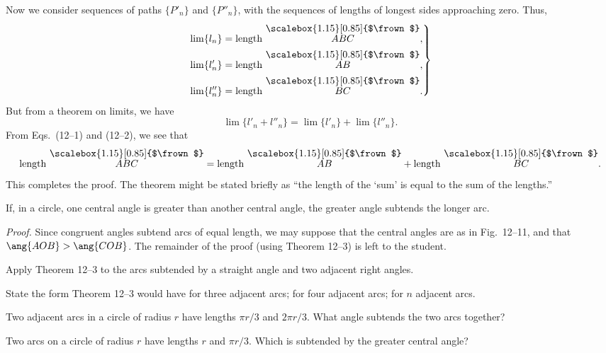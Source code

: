 \documentclass[11pt]{book}
\theoremstyle{bkplain}
\theoremstyle{XIplainnote}
\theoremstyle{bkplain}
\newcommand{\XIIarc}[1]{\overset{\raisebox{-0.25ex}{\scalebox{1.15}[0.85]{$\frown$}}}{#1}}
\theoremstyle{bkplain}
\begin{document}
Now we consider sequences of paths $\{P'_n\}$ and $\{P''_n\}$, with the
sequences of lengths of longest sides approaching zero. Thus,
\begin{equation}
\left.
\begin{aligned}
\lim \{l_n\} &= \text{length } \XIIarc{ABC},\\
\lim \{l'_n\} &= \text{length } \XIIarc{AB},\\
\lim \{l''_n\} &= \text{length } \XIIarc{BC}.
\end{aligned}
\right\}
\end{equation}
But from a theorem on limits, we have
\begin{equation}
\lim \{l'_n + l''_n\} = \lim \{l'_n\} + \lim \{l''_n\}.
\end{equation}
From Eqs.~(12--1) and (12--2), we see that
\begin{equation}
\text{length } \XIIarc{ABC} = \text{length } \XIIarc{AB} + \text{length }
\XIIarc{BC}.
\end{equation}
This completes the proof. The theorem might be stated briefly as ``the length of
the `sum' is equal to the sum of the lengths.''

\FIGXIIELEVENTWELVE

\begin{theorem}
If, in a circle, one central angle is greater than another central angle, the
greater angle subtends the longer arc.
\end{theorem}

\noindent\emph{Proof.} Since congruent angles subtend arcs of equal length, we
may suppose that the central angles are as in Fig.~12--11, and that
$\ang{AOB} > \ang{COB}$. The remainder of the proof (using Theorem 12--3) is
left to the student.

\begin{exercisecols}
\begin{exlist}
\item Apply Theorem 12--3 to the arcs subtended by a straight angle and two
      adjacent right angles.
\item State the form Theorem 12--3 would have for three adjacent arcs; for four
      adjacent arcs; for $n$ adjacent arcs.
\item Two adjacent arcs in a circle of radius $r$ have lengths $\pi r/3$ and
      $2\pi r/3$. What angle subtends the two arcs together?
\item Two arcs on a circle of radius $r$ have lengths $r$ and $\pi r/3$. Which
      is subtended by the greater central angle?
\end{exlist}
\end{exercisecols}
\end{document}
